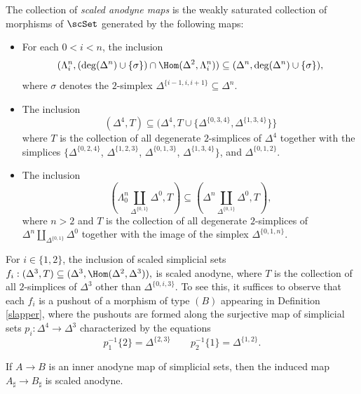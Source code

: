 \begin{definition}\label{slapper}
The collection of {\it scaled anodyne maps} is the weakly saturated collection of morphisms
of $\scSet$ generated by the following maps:
\begin{itemize}
\item[$(A)$] For each $0 < i < n$, the inclusion
$$ ( \Lambda^n_i, (\deg(\Delta^n) \cup \{ \sigma \}) \cap \Hom( \Delta^2, \Lambda^n_i) ) \subseteq ( \Delta^n, \deg( \Delta^n) \cup \{ \sigma \}),$$
where $\sigma$ denotes the $2$-simplex $\Delta^{ \{i-1, i, i+1\} } \subseteq \Delta^n$.

\item[$(B)$] The inclusion
$$ (\Delta^4, T ) \subseteq (\Delta^4, T
\cup \{ \Delta^{ \{0,3,4\} }, \Delta^{ \{1,3,4\} } \} \}$$
where $T$ is the collection of all degenerate $2$-simplices of $\Delta^4$ together with the simplices $\{ \Delta^{ \{0,2,4\} }$, $\Delta^{ \{1,2,3 \} }$, $\Delta^{ \{ 0, 1, 3 \} }$, $\Delta^{ \{1,3, 4 \} } \}$, and
$\Delta^{ \{0,1,2\} }$.

\item[$(C)$] The inclusion
$$ ( \Lambda^{n}_0 \coprod_{ \Delta^{ \{0,1\} }} \Delta^0, T)
\subseteq ( \Delta^n \coprod_{ \Delta^{ \{0,1\} } } \Delta^0, T),$$
where $n > 2$ and $T$ is the collection of all degenerate $2$-simplices of
$\Delta^n \coprod_{ \Delta^{ \{0,1\} }} \Delta^0$ together with the image
of the simplex $\Delta^{ \{0,1,n\} }$. 
\end{itemize}
\end{definition}

\begin{remark}\label{slapperB}
For $i \in \{1,2\}$, the inclusion of scaled simplicial sets
$f_i: ( \Delta^3, T) \subseteq ( \Delta^3, \Hom( \Delta^2, \Delta^3) ),$
is scaled anodyne, where $T$ is the collection of all $2$-simplices of $\Delta^3$ other than
$\Delta^{ \{0, i, 3 \} }$. To see this, it suffices to observe that each $f_i$ is a pushout of a morphism of
type $(B)$ appearing in Definition \ref{slapper}, where the pushouts are formed along the surjective map of simplicial sets $p_i: \Delta^4 \rightarrow \Delta^3$ characterized by the equations
$$p_1^{-1} \{2\} = \Delta^{ \{2,3\} } \quad \quad p_2^{-1} \{1\} = \Delta^{ \{1,2\} }.$$
\end{remark}

\begin{remark}\label{tweepus}
If $A \rightarrow B$ is an inner anodyne map of simplicial sets, then the induced map
$A_{\sharp} \rightarrow B_{\sharp}$ is scaled anodyne.
\end{remark}


